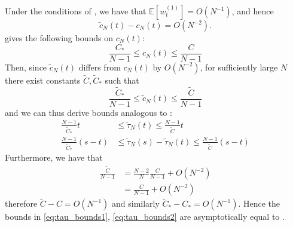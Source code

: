 \documentclass{article}
\newcommand{\E}{\mathbb{E}}
\newcommand{\wt}[2][t]{w_{#1}^{(#2)}}
\begin{document}
Under the conditions of \citet[Corollary 2]{koskela2018}, we have that $\E[\wt{1}] = O(N^{-1})$, and hence
\begin{equation*}
\tilde{c}_N(t) - c_N(t) = O(N^{-2}).
\end{equation*}
\citet{koskela2018} gives the following bounds on $c_N(t)$:
\begin{equation*}
\frac{C_*}{N-1} \leq c_N(t) \leq \frac{C}{N-1}
\end{equation*}
Then, since $\tilde{c}_N(t)$ differs from $c_N(t)$ by $O(N^{-2})$, for sufficiently large $N$ there exist constants $\tilde{C}, \tilde{C}_*$ such that
\begin{equation*}
\frac{\tilde{C}_*}{N-1} \leq \tilde{c}_N(t) \leq \frac{\tilde{C}}{N-1}
\end{equation*}
and we can thus derive bounds analogous to \citet[(5)-(6)]{koskela2018}:
\begin{align}
\frac{N-1}{\tilde{C}_*}t &\leq \tilde{\tau}_N(t) \leq \frac{N-1}{\tilde{C}}t \label{eq:tau_bounds1}\\
\frac{N-1}{\tilde{C}_*}(s-t) &\leq \tilde{\tau}_N(s) - \tilde{\tau}_N(t) \leq \frac{N-1}{\tilde{C}}(s-t) \label{eq:tau_bounds2}
\end{align}
Furthermore, we have that
\begin{align*}
\frac{\tilde{C}}{N-1} &= \frac{N-2}{N} \frac{C}{N-1} + O(N^{-2}) \\
&= \frac{C}{N-1} + O(N^{-2})
\end{align*}
therefore $\tilde{C} - C = O(N^{-1})$ and similarly $\tilde{C}_* - C_* = O(N^{-1})$. Hence the bounds in \eqref{eq:tau_bounds1}, \eqref{eq:tau_bounds2} are asymptotically equal to \citet[(5)-(6)]{koskela2018}.
\end{document}
